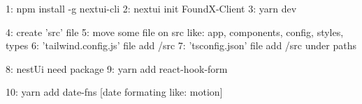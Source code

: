 1: npm install -g nextui-cli
2: nextui init FoundX-Client
3: yarn dev


4: create 'src' file
5: move some file on src like: app, components, config, styles, types
6: 'tailwind.config.js' file add /src
7: 'tsconfig.json' file add /src under paths

8: nestUi need package
9: yarn add react-hook-form

10: yarn add date-fns [date formating like: motion]